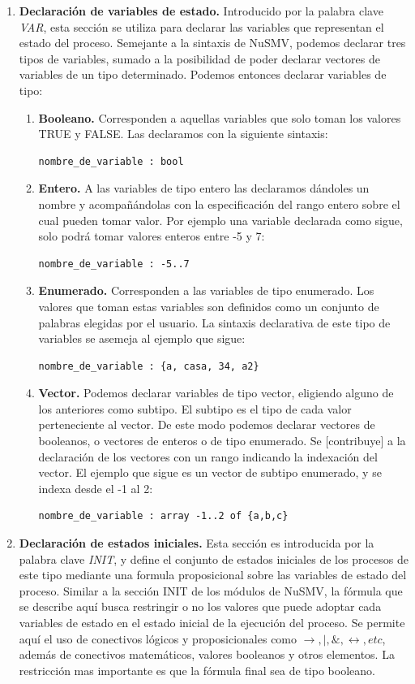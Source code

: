 \documentclass[titlepage, 12pt]{book}
\begin{document}
\begin{enumerate}
\item \textbf{Declaraci\'on de variables de estado.} Introducido por la palabra clave \textit{VAR}, esta secci\'on se utiliza para declarar las variables que representan el estado del proceso. Semejante a la sintaxis de NuSMV, podemos declarar tres tipos de variables, sumado a la posibilidad de poder declarar vectores de variables de un tipo determinado. Podemos entonces declarar variables de tipo:
\begin{enumerate}
\item \textbf{Booleano.} Corresponden a aquellas variables que solo toman los valores TRUE y FALSE. Las declaramos con la siguiente sintaxis: \begin{verbatim}nombre_de_variable : bool\end{verbatim}
\item \textbf{Entero.} A las variables de tipo entero las declaramos d\'andoles un nombre y acompañ\'andolas con la especificaci\'on del rango entero sobre el cual pueden tomar valor. Por ejemplo una variable declarada como sigue, solo podr\'a tomar valores enteros entre -5 y 7: \begin{verbatim}nombre_de_variable : -5..7\end{verbatim}
\item \textbf{Enumerado.} Corresponden a las variables de tipo enumerado. Los valores que toman estas variables son definidos como un conjunto de palabras elegidas por el usuario. La sintaxis declarativa de este tipo de variables se asemeja al ejemplo que sigue: \begin{verbatim}nombre_de_variable : {a, casa, 34, a2}\end{verbatim}
\item \textbf{Vector.} Podemos declarar variables de tipo vector, eligiendo alguno de los anteriores como subtipo. El subtipo es el tipo de cada valor perteneciente al vector. De este modo podemos declarar vectores de booleanos, o vectores de enteros o de tipo enumerado. Se [contribuye] a la declaraci\'on de los vectores con un rango indicando la indexaci\'on del vector. El ejemplo que sigue es un vector de subtipo enumerado, y se indexa desde el -1 al 2: \begin{verbatim}nombre_de_variable : array -1..2 of {a,b,c}\end{verbatim}
\end{enumerate}
\item \textbf{Declaraci\'on de estados iniciales.}
Esta secci\'on es introducida por la palabra clave \textit{INIT}, y define el conjunto de estados iniciales de los procesos de este tipo mediante una formula proposicional sobre las variables de estado del proceso. Similar a la secci\'on INIT de los m\'odulos de NuSMV, la f\'ormula que se describe aqu\'i busca restringir o no los valores que puede adoptar cada variables de estado en el estado inicial de la ejecuci\'on del proceso. Se permite aqu\'i el uso de conectivos l\'ogicos y proposicionales como $\rightarrow, |, \&, \leftrightarrow, etc$, adem\'as de conectivos matem\'aticos, valores booleanos y otros elementos. La restricci\'on mas importante es que la f\'ormula final sea de tipo booleano.

\end{enumerate}
\end{document}
